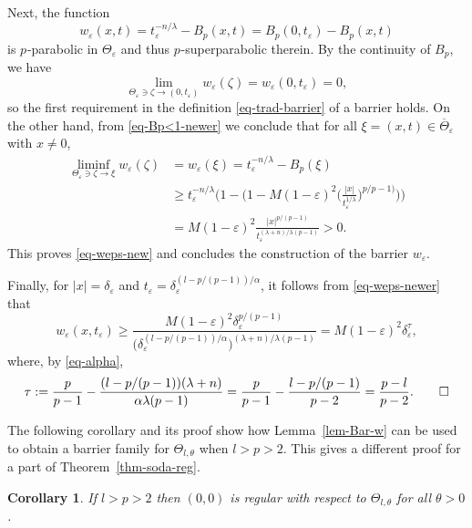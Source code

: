 \documentclass[a4paper, twoside]{article}
\makeatletter
\theoremstyle{propositional}
\newtheorem{cor}[thm]{Corollary}
\theoremstyle{descriptive}
\renewenvironment{proof}[1][\proofname]{\par
  \pushQED{\qed}%
  \normalfont
  \trivlist
  \item[\hskip\labelsep
        \itshape
    #1\@addpunct{.}]\ignorespaces
}{%
  \popQED\endtrivlist\@endpefalse
}
\numberwithin{equation}{section}
\newcommand{\eps}{\varepsilon}
\newcommand{\al}{\alpha}
\newcommand{\de}{\delta}
\newcommand{\p}{{$p\mspace{1mu}$}}
\newcommand{\la}{\lambda}
\makeatother
\begin{document}
\begin{proof}
Next,  the function
\[
 w_\eps(x,t) = t_\eps^{-n/\la} - B_p(x,t)=
B_p(0,t_\eps) - B_p(x,t)
\]
is \p-parabolic in $\Theta_\eps$
and thus \p-superparabolic therein.
By the continuity of $B_p$, we have
\begin{equation} \label{eq-wt_eps-lim-new}
\lim_{\Theta_\eps \ni \zeta \to (0,t_\eps)} w_\eps(\zeta) = w_\eps(0,t_\eps) = 0,
\end{equation}
so the first requirement in the definition \eqref{eq-trad-barrier} of 
a barrier holds.
On the other hand, from \eqref{eq-Bp<1-newer}
we conclude that 
for all $\xi =(x,t) \in \overline{\Theta}_\eps$ with  $x\ne0$,
\begin{align} %
\liminf_{\Theta_\eps \ni \zeta \to \xi} w_{\eps}(\zeta) 
&= w_{\eps}(\xi) 
= t_\eps^{-n/\la} - B_p(\xi) \nonumber\\
& \ge t_\eps^{-n/\la} \biggl( 1- \biggl(1- M(1-\eps)^2 
\biggl( \frac{|x|}{t_\eps^{1/\la}} \biggr)^{p/{p-1)}}
\biggr)
\biggr) \nonumber \\
&= M(1-\eps)^2\frac{|x|^{p/(p-1)}}{ t_\eps^{(\la+n)/\la(p-1)} } 
> 0.  \label{eq-weps-newer}
\end{align}
This proves \eqref{eq-weps-new} and
concludes the construction of the barrier $w_\eps$.

Finally, for $|x|=\de_\eps$ and $t_\eps= \de_\eps^{(l-p/(p-1))/\al}$,
it follows from 
\eqref{eq-weps-newer} that
\[
w_{\eps}(x,t_\eps) \ge
\frac{ M(1-\eps)^2 \de_\eps^{p/(p-1)}}{ \bigl(\de_\eps^{(l-p/(p-1))/\al} \bigr)^{(\la+n)/\la(p-1)} }   
= M(1-\eps)^2 \de_\eps^\tau,
\]
where, by \eqref{eq-alpha},
\begin{equation*}   %
\tau := \frac{p}{p-1} - \frac{(l-p/(p-1))(\la+n)}{\al \la (p-1)} 
= \frac{p}{p-1} - \frac{l-p/(p-1)}{p-2} 
= \frac{p-l}{p-2}.\qedhere
\end{equation*}
\end{proof}




The following corollary and its proof show how Lemma~\ref{lem-Bar-w} can be used
to obtain a barrier family for $\Theta_{l,\theta}$ when $l>p>2$.
This gives a different proof for a part of Theorem~\ref{thm-soda-reg}.

\begin{cor}  \label{cor-barrier-family-Barenblatt}
If $l>p>2$ then $(0,0)$ is regular with respect to $\Theta_{l,\theta}$
for all $\theta>0$.
\end{cor}
\end{document}
